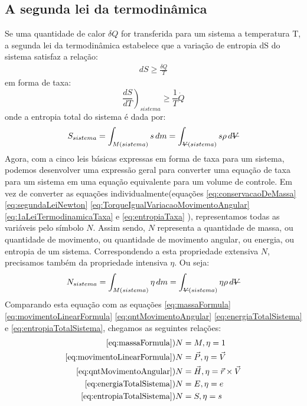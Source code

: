 \documentclass{article}
\newcommand{\stkout}[1]{\ifmmode\text{\sout{\ensuremath{#1}}}\else\sout{#1}\fi}
\begin{document}
\subsection{A segunda lei da termodinâmica}
Se uma quantidade de calor $\delta Q$ for transferida para um sistema a temperatura T, a segunda lei da termodinâmica estabelece que a variação de entropia dS do sistema satisfaz a relação:
\begin{align*}
   dS\ge\frac{\delta Q}{T}
\end{align*}
em forma de taxa:
\begin{equation}
  \left.\frac{dS}{dT}\right)_{sistema}\ge \frac{1}{T}\dot{Q}
  \label{eq:entropiaTaxa}
\end{equation}
onde a entropia total do sistema é dada por:
\begin{equation}
  S_{sistema}=\int_{M(sistema)}^{ } s\, dm=\int_{\stkout{V}(sistema)}^{ } s \rho \, d\stkout{V}
  \label{eq:entropiaTotalSistema}
\end{equation}
Agora, com a cinco leis básicas expressas em forma de taxa para um sistema, podemos desenvolver uma expressão geral para converter uma equação de taxa para um sistema em uma equação equivalente para um volume de controle. Em vez de converter as equações individualmente(equações \ref{eq:conservacaoDeMassa} \ref{eq:segundaLeiNewton} \ref{eq:TorqueIgualVariacaoMovimentoAngular} \ref{eq:1aLeiTermodinamicaTaxa} e \ref{eq:entropiaTaxa} ), representamos todas as variáveis pelo símbolo $N$. Assim sendo, $N$ representa a quantidade de massa, ou quantidade de movimento, ou quantidade de movimento angular, ou energia, ou entropia de um sistema. Correspondendo a esta propriedade extensiva $N$, precisamos também da propriedade intensiva $\eta$. Ou seja:
\begin{equation}
  N_{sistema}=\int_{M(sistema)}^{ } \eta \, dm = \int_{\stkout{V}(sistema)}^{ } \eta \rho\, d\stkout{V}
  \label{eq:equacaoGeralPropExtensivaPropIntensiva}
\end{equation}
Comparando esta equação com as equações \ref{eq:massaFormula} \ref{eq:movimentoLinearFormula} \ref{eq:qntMovimentoAngular} \ref{eq:energiaTotalSistema} e \ref{eq:entropiaTotalSistema}, chegamos as seguintes relações:
\begin{align*}
  \ref{eq:massaFormula}) &N=M, \eta=1\\
  \ref{eq:movimentoLinearFormula}) &N=\vec{P}, \eta=\vec{V}\\
  \ref{eq:qntMovimentoAngular}) &N=\vec{H}, \eta=\vec{r} \times \vec{V}\\
  \ref{eq:energiaTotalSistema}) &N=E, \eta=e \\
  \ref{eq:entropiaTotalSistema}) &N=S, \eta=s \\
\end{align*}
\end{document}
